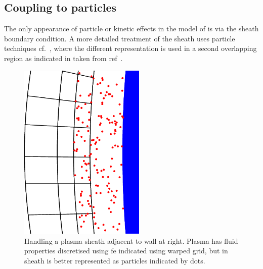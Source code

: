 \subsection{Coupling to particles}\label{sec:coupart2D}
The only appearance of particle or kinetic effects in the model of 
is via the sheath
boundary condition. A more detailed treatment of the sheath uses particle
techniques cf.\ , where the different representation is used in
a second overlapping region as indicated in  taken from
ref~\cite{y1re231}.
\begin{figure}
\centerline{\includegraphics[width=6cm]{../png/pclovm}}
\caption{Handling a plasma sheath adjacent to wall at right.
Plasma has fluid properties discretised using fe indicated using warped grid,
but in sheath is better represented as particles indicated by dots.\label{fig:pcleadj}} 
\end{figure}


